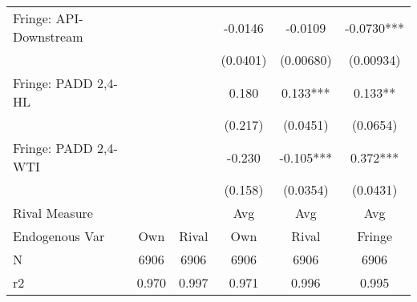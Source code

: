 {\begin{tabular}{l*{5}{c}}
\addlinespace
Fringe: API-Downstream&            &            &  -0.0146   &  -0.0109   &  -0.0730***\\
                &            &            & (0.0401)   &(0.00680)   &(0.00934)   \\
\addlinespace
Fringe: PADD 2,4-HL&            &            &    0.180   &    0.133***&    0.133** \\
                &            &            &  (0.217)   & (0.0451)   & (0.0654)   \\
\addlinespace
Fringe: PADD 2,4-WTI&            &            &   -0.230   &   -0.105***&    0.372***\\
                &            &            &  (0.158)   & (0.0354)   & (0.0431)   \\
\midrule
Rival Measure   &            &            &      Avg   &      Avg   &      Avg   \\
Endogenous Var  &      Own   &    Rival   &      Own   &    Rival   &   Fringe   \\
N               &     6906   &     6906   &     6906   &     6906   &     6906   \\
r2              &    0.970   &    0.997   &    0.971   &    0.996   &    0.995   \\
\bottomrule
\end{tabular}
}
